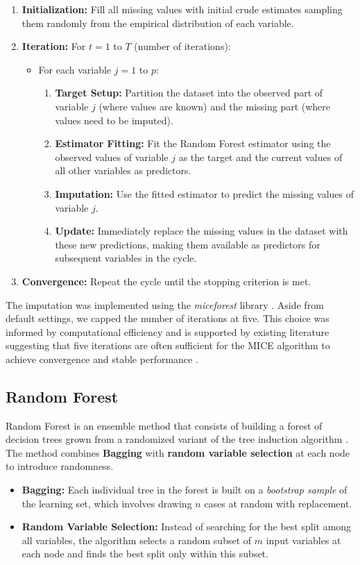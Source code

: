 \documentclass[11pt, a4paper]{article}
\begin{document}
\begin{enumerate}
    \item \textbf{Initialization:} Fill all missing values with initial crude estimates sampling them randomly from the empirical distribution of each variable.
    \item \textbf{Iteration:} For $t = 1$ to $T$ (number of iterations):
    \begin{itemize}
        \item For each variable $j = 1$ to $p$:
        \begin{enumerate}
            \item \textbf{Target Setup:} Partition the dataset into the observed part of variable $j$ (where values are known) and the missing part (where values need to be imputed).
\item \textbf{Estimator Fitting:} Fit the Random Forest estimator using the observed values of variable $j$ as the target and the current values of all other variables as predictors.
\item \textbf{Imputation:} Use the fitted estimator to predict the missing values of variable $j$.
\item \textbf{Update:} Immediately replace the missing values in the dataset with these new predictions, making them available as predictors for subsequent variables in the cycle.
\end{enumerate}
    \end{itemize}
    \item \textbf{Convergence:} Repeat the cycle until the stopping criterion is met.
\end{enumerate}
The imputation was implemented using the \textit{miceforest} library \cite{miceforest2025}. Aside 
from default settings, we capped the number of iterations at five. This choice was informed 
by computational efficiency and is supported by existing literature suggesting that five 
iterations are often sufficient 
for the MICE algorithm to achieve convergence and stable performance \cite{vanbuuren2011mice}.

\subsection{Random Forest}
Random Forest is an ensemble method that consists of building a forest of decision trees grown from a randomized variant of the tree induction algorithm \citep{Stekhoven2012}.
The method combines \textbf{Bagging} with \textbf{random variable selection} at each node to introduce randomness.
\begin{itemize}
    \item \textbf{Bagging:} Each individual tree in the forest is built on a \textit{bootstrap sample} of the learning set, which involves drawing $n$ cases at random with replacement.
    \item \textbf{Random Variable Selection:} Instead of searching for the best split among all variables, the algorithm selects a random subset of $m$ input variables at each node and finds the best split only within this subset.
\end{itemize}
\end{document}
